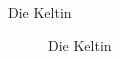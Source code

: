 \documentclass[
  letterpaper,
  DIV=11,
  numbers=noendperiod]{scrartcl}
\makeatletter
\let\oldparagraph\paragraph
\renewcommand{\paragraph}{
    \@ifstar
      \xxxParagraphStar
      \xxxParagraphNoStar
  }
\newcommand{\xxxParagraphStar}[1]{\oldparagraph*{#1}\mbox{}}
\newcommand{\xxxParagraphNoStar}[1]{\oldparagraph{#1}\mbox{}}
\makeatother
\begin{document}
\paragraph{Die Keltin}\label{die-keltin}

\begin{figure}


\caption{\label{fig-die-keltin}Die Keltin}

\end{figure}%
\end{document}

